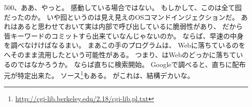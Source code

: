 500、ああ、やっと。
感動している場合ではない。
もしかして、このは全て囮だったのか。
いや囮というのは見え見えのOSコマンドインジェクションだ。
あれはあると思わせておいて実は内部で呼び出しているに脆弱性があり、
だから皆キーワードのコミットすら出来ていなんじゃないのか。
ならば、早速の中身を調べなけけばなるまい。
まあこの手のプログラムは、
Webに落ちているのをへそのまま流用したという可能性がある。
つまり、はWebのどっかに落ちているのではなかろうか。
ならば直ちに検索開始。
Googleで調べると、直ちに配布元が特定出来た。
ソース\footnote{\url{http://cgi-lib.berkeley.edu/2.18/cgi-lib.pl.txt}}もある。
がこれは、結構デカいな。

